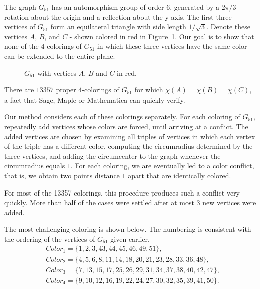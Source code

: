 \documentclass [11pt,oneside]{amsart}
\theoremstyle{definition}
\theoremstyle{plain}
\begin{document}
The graph $G_{51}$ has an automorphism group of order 6, generated by a $2 \pi/3$ rotation about the
origin and a reflection about the y-axis. The first three vertices of $G_{51}$ form an equilateral triangle
with side length $1/\sqrt{3}$.  Denote these vertices $A$, $B$, and $C$ - shown colored in red in Figure~\ref{fig:g51}.
Our goal is to show that none of the 4-colorings of $G_{51}$ in which these three vertices have the same color can be extended to the entire plane.

\begin{figure}[ht]
\centering

\caption{$G_{51}$ with vertices $A$, $B$ and $C$ in red.}
\label{fig:g51}
\end{figure}

There are $13357$ proper $4$-colorings of $G_{51}$ for which $\chi(A)=\chi(B)=\chi(C)$, a fact that Sage, Maple or Mathematica can quickly verify.

Our method considers each of these colorings separately. For each coloring of  $G_{51}$, repeatedly add vertices whose colors are
forced, until arriving at a conflict. The added vertices are chosen by examining all triples of vertices in which each vertex of the triple has a different color,
computing the circumradius determined by the three vertices, and adding the circumcenter to the graph whenever the circumradius equals $1$.
For each coloring, we are eventually led to a color conflict, that is, we obtain two points distance $1$ apart that are identically colored.

For most of the 13357 colorings, this procedure produces such a conflict very quickly.
More than half of the cases were settled after at most 3 new vertices were added.

The most challenging coloring is shown below. The numbering is consistent with the ordering of the vertices of $G_{51}$ given earlier.
\begin{align*}
&Color_1=\{1, 2, 3, 43, 44, 45, 46, 49, 51\},\\
&Color_2=\{4, 5, 6, 8, 11, 14, 18, 20, 21, 23, 28, 33, 36, 48\},\\
&Color_3=\{7, 13, 15, 17, 25, 26, 29, 31, 34, 37, 38, 40, 42, 47\},\\
&Color_4=\{9, 10, 12, 16, 19, 22, 24, 27, 30, 32, 35, 39, 41, 50\}.
\end{align*}
\end{document}
